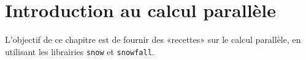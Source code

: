 \chapter{Introduction au calcul parallèle\label{c:s:parallel}}

L'objectif de ce chapitre est de fournir des «recettes» sur le calcul parallèle, en utilisant les librairies \texttt{snow} et \texttt{snowfall}.

